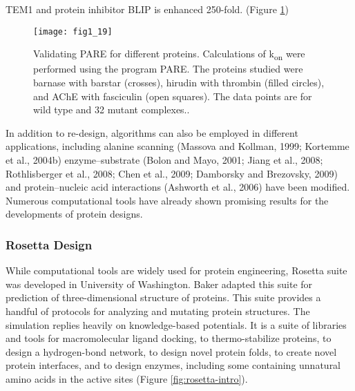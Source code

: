 \begin{refsection}
TEM1 and protein inhibitor BLIP is enhanced 250-fold\cite{Selzer2000}. (Figure
\ref{fig:tem1})
\begin{figure}[h!] \centering \texttt{[image: fig1\_19]}
    \caption[Validating PARE for different proteins. Calculations of
        k\textsubscript{on} were performed using the program PARE. The proteins
        studied were barnase with barstar (crosses), hirudin with thrombin
        (filled circles), and AChE with fasciculin (open squares). The data
        points are for wild type and 32 mutant complexes.]{Validating PARE for
            different proteins.  Calculations of k\textsubscript{on} were
            performed using the program PARE. The proteins studied were barnase
            with barstar (crosses), hirudin with thrombin (filled circles), and
            AChE with fasciculin (open squares). The data points are for wild
            type and 32 mutant complexes.\cite{Selzer2000}.} 
            \label{fig:tem1} 
\end{figure}
In addition to re-design, algorithms can also be employed in different
applications, including alanine scanning (Massova and Kollman, 1999; Kortemme
et al., 2004b) enzyme–substrate (Bolon and Mayo, 2001; Jiang et al., 2008;
Rothlisberger et al., 2008; Chen et al., 2009; Damborsky and Brezovsky, 2009)
and protein–nucleic acid interactions (Ashworth et al., 2006) have been
modified. Numerous computational tools have already shown promising results for
the developments of protein designs. 

\subsubsection{Rosetta Design}

While computational tools are widely used for protein
engineering\cite{Rothlisberger2008,DiMaio2011a,Korkegian2005,
Leaver-Fay2013a,Leaver-Fay2011,Drew2013a,Kaufmann2010,Rohl2004}, Rosetta suite
was developed in University of Washington. Baker  adapted this
suite for prediction of three-dimensional structure of
proteins\cite{Leaver-Fay2011}. This suite provides a handful of protocols for
analyzing and mutating protein structures.  The simulation replies heavily on
knowledge-based potentials. It is a suite of libraries and tools for
macromolecular ligand docking, to thermo-stabilize proteins, to design a
hydrogen-bond network, to design novel protein folds, to create novel protein
interfaces, and to design enzymes, including some containing unnatural amino
acids in the active sites (Figure \ref{fig:rosetta-intro}).


\end{refsection}
